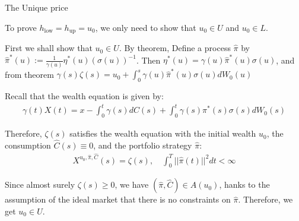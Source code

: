 \documentclass{beamer}
\begin{document}
\begin{frame}{The Unique price}

    {\footnotesize \footnotesize
    \par To prove \( h_{\text{low}} = h_{\text{up}} = u_0 \), we only need to show that \( u_0 \in U \) and \( u_0 \in L \).
    \vspace{1em}
    \par First we shall show that \( u_0 \in U \). By theorem, Define a process \(\hat{\pi}\) by $\hat{\pi}^*(u) := \frac{1}{\gamma(u)} \eta^*(u)(\sigma(u))^{-1}$. 
    Then $\eta^*(u) = \gamma(u) \hat{\pi}^*(u) \sigma(u)$, and from theorem $\gamma(s) \zeta(s) = u_0 + \int_0^s \gamma(u) \hat{\pi}^*(u) \sigma(u) dW_0(u)$
    \vspace{1em}
    \par  \pause Recall that the wealth equation is given by:
    \begin{align*}
        \gamma(t) X(t) = x - \int_0^t \gamma(s) dC(s) + \int_0^t \gamma(s) \pi^*(s) \sigma(s) dW_0(s)
    \end{align*}
    \par Therefore, \(\zeta(s)\) satisfies 
    the wealth equation with the initial wealth \( u_0 \), the 
    consumption \(\hat{C}(s) \equiv 0\), and the portfolio strategy \(\hat{\pi}\):
    \begin{align*}
        X^{u_0, \hat{\pi}, \hat{C}}(s) = \zeta(s), \quad \int_0^T ||\hat{\pi}(t)||^2 dt < \infty
    \end{align*}
    \par  \pause Since almost surely \(\zeta(s) \geq 0\), we have \(\left( \hat{\pi}, \hat{C} \right) \in A(u_0)\), 
    hanks to the assumption of the ideal market that there is no constraints on \(\hat{\pi}\). Therefore, we get \( u_0 \in U \).
    }

\end{frame}
\end{document}
